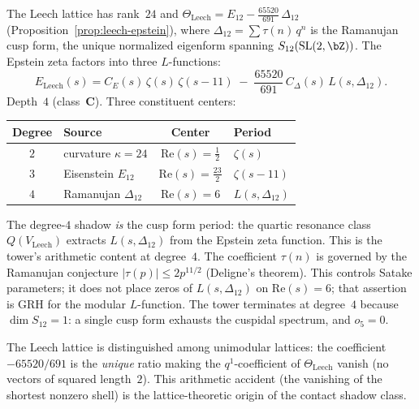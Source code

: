 \begin{computation}
\label{comp:period-shadow-leech}
\ClaimStatusProvedHere
The Leech lattice has rank~$24$ and
$\Theta_{\mathrm{Leech}} = E_{12} - \frac{65520}{691}\,\Delta_{12}$
(Proposition~\textup{\ref{prop:leech-epstein}}),
where $\Delta_{12} = \sum \tau(n)\,q^n$ is the Ramanujan cusp form,
the unique normalized eigenform spanning
$S_{12}(\mathrm{SL}(2,\bZ))$. The Epstein zeta factors into
three $L$-functions:
\begin{equation}\label{eq:leech-three-L}
 E_{\mathrm{Leech}}(s)
 = C_E(s)\,\zeta(s)\,\zeta(s{-}11)
 \;-\;
 \frac{65520}{691}\,C_\Delta(s)\,L(s,\Delta_{12}).
\end{equation}
Depth~$4$ (class~$\mathbf{C}$). Three constituent centers:
\begin{center}
\renewcommand{\arraystretch}{1.2}
\begin{tabular}{clcl}
\toprule
\textbf{Degree} & \textbf{Source} & \textbf{Center} & \textbf{Period} \\
\midrule
$2$ & curvature $\kappa = 24$
 & $\mathrm{Re}(s) = \tfrac12$ & $\zeta(s)$ \\
$3$ & Eisenstein $E_{12}$
 & $\mathrm{Re}(s) = \tfrac{23}{2}$ & $\zeta(s{-}11)$ \\
$4$ & Ramanujan $\Delta_{12}$
 & $\mathrm{Re}(s) = 6$ & $L(s,\Delta_{12})$ \\
\bottomrule
\end{tabular}
\end{center}
The degree-$4$ shadow \emph{is} the cusp form period: the quartic
resonance class $Q(V_{\mathrm{Leech}})$ extracts $L(s,\Delta_{12})$
from the Epstein zeta function. This is the tower's arithmetic content at degree~$4$. The coefficient
$\tau(n)$ is governed by the Ramanujan conjecture
$\lvert\tau(p)\rvert \le 2p^{11/2}$ (Deligne's theorem). This
controls Satake parameters; it does not place zeros of
$L(s,\Delta_{12})$ on $\mathrm{Re}(s)=6$; that assertion is GRH for
the modular $L$-function. The tower terminates at degree~$4$ because
$\dim S_{12} = 1$: a single cusp form exhausts the cuspidal
spectrum, and $o_5 = 0$.

The Leech lattice is distinguished among unimodular lattices:
the coefficient
$-65520/691$ is the \emph{unique} ratio making the $q^1$-coefficient
of $\Theta_{\mathrm{Leech}}$ vanish (no vectors of squared
length~$2$). This arithmetic accident (the vanishing of the
shortest nonzero shell) is the lattice-theoretic origin of the
contact shadow class.
\end{computation}


